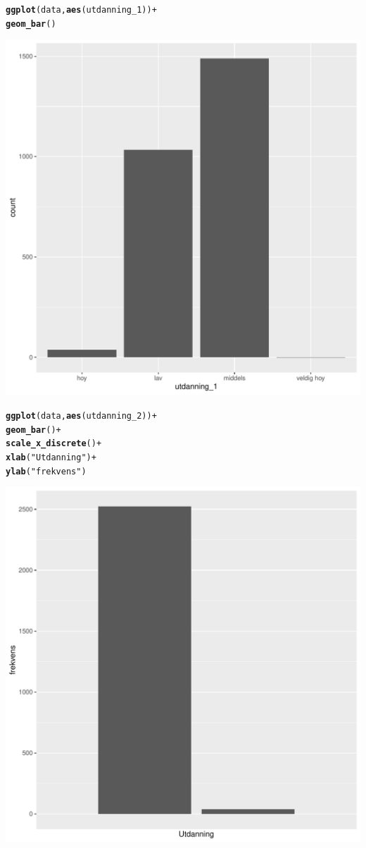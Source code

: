 \documentclass{article}\usepackage[]{graphicx}\usepackage[]{color}
\makeatletter
\def\maxwidth{ %
  \ifdim\Gin@nat@width>\linewidth
    \linewidth
  \else
    \Gin@nat@width
  \fi
}
\newcommand{\hlstr}[1]{\textcolor[rgb]{0.192,0.494,0.8}{#1}}%
\newcommand{\hlopt}[1]{\textcolor[rgb]{0,0,0}{#1}}%
\newcommand{\hlstd}[1]{\textcolor[rgb]{0.345,0.345,0.345}{#1}}%
\newcommand{\hlkwd}[1]{\textcolor[rgb]{0.737,0.353,0.396}{\textbf{#1}}}%
\newenvironment{kframe}{%
 \def\at@end@of@kframe{}%
 \ifinner\ifhmode%
  \def\at@end@of@kframe{\end{minipage}}%
  \begin{minipage}{\columnwidth}%
 \fi\fi%
 \def\FrameCommand##1{\hskip\@totalleftmargin \hskip-\fboxsep
 \colorbox{shadecolor}{##1}\hskip-\fboxsep
     \hskip-\linewidth \hskip-\@totalleftmargin \hskip\columnwidth}%
 \MakeFramed {\advance\hsize-\width
   \@totalleftmargin\z@ \linewidth\hsize
   \@setminipage}}%
 {\par\unskip\endMakeFramed%
 \at@end@of@kframe}
\newenvironment{knitrout}{}{} %
\makeatother
\begin{document}
\begin{knitrout}
\begin{kframe}
\begin{alltt}
\hlkwd{ggplot}\hlstd{(data,} \hlkwd{aes}\hlstd{(utdanning_1))} \hlopt{+}
  \hlkwd{geom_bar}\hlstd{()}
\end{alltt}
\end{kframe}
\includegraphics[width=\maxwidth]{figure/lager_mer_utdanning-1} 
\begin{kframe}\begin{alltt}
\hlkwd{ggplot}\hlstd{(data,} \hlkwd{aes}\hlstd{(utdanning_2))} \hlopt{+}
  \hlkwd{geom_bar}\hlstd{()} \hlopt{+}
  \hlkwd{scale_x_discrete}\hlstd{()} \hlopt{+}
  \hlkwd{xlab}\hlstd{(}\hlstr{"Utdanning"}\hlstd{)} \hlopt{+}
  \hlkwd{ylab}\hlstd{(}\hlstr{"frekvens"}\hlstd{)}
\end{alltt}
\end{kframe}
\includegraphics[width=\maxwidth]{figure/lager_mer_utdanning-2} 


\end{knitrout}
\end{document}

